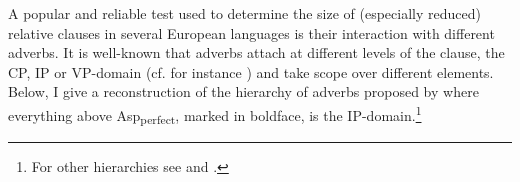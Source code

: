 A popular and reliable test used to determine the size of (especially reduced) relative clauses in several European languages is their interaction with different adverbs. It is well-known that adverbs attach at different levels of the clause, the CP, IP or VP-domain (cf. for instance \citealt{ramchand:2014:deriving}) and take scope over different elements. Below, I give a reconstruction of the hierarchy of adverbs proposed by \citet[109]{cinque:1999:adverbs} where everything above Asp\textsubscript{perfect}, marked in boldface, is the IP-domain.\footnote{For other hierarchies see \citet{laenzlinger:2011:elements} and \citet{morzycki:2016:mod}.}


